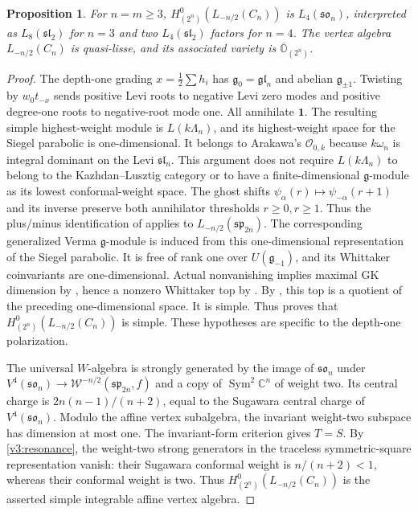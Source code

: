 \documentclass[11pt,a4paper]{amsart}
\numberwithin{equation}{section}
\newtheorem{proposition}[theorem]{Proposition}
\theoremstyle{definition}
\theoremstyle{remark}
\newcommand{\C}{\mathbb C}
\newcommand{\g}{\mathfrak g}
\newcommand{\clO}[1]{\overline{\mathbb O}_{(#1)}}
\newcommand{\spg}{\mathfrak{sp}}
\newcommand{\sog}{\mathfrak{so}}
\newcommand{\slg}{\mathfrak{sl}}
\newcommand{\glg}{\mathfrak{gl}}
\newcommand{\Sym}{\operatorname{Sym}}
\begin{document}
\begin{proposition}\label{seed:C-full}
For $n=m\ge3$, $H^0_{(2^n)}(L_{-n/2}(C_n))$ is
$L_4(\sog_n)$, interpreted as $L_8(\slg_2)$ for $n=3$ and two
$L_4(\slg_2)$ factors for $n=4$. The vertex algebra $L_{-n/2}(C_n)$ is quasi-lisse, and its associated
variety is $\clO{2^n}$.
\end{proposition}
\begin{proof}
The depth-one grading $x=\frac12\sum h_i$ has
$\g_0=\glg_n$ and abelian $\g_{\pm1}$. Twisting by $w_0t_{-x}$
sends positive Levi roots to negative Levi zero modes and positive
degree-one roots to negative-root mode one. All annihilate $\mathbf1$.
The resulting simple highest-weight module is $L(k\Lambda_n)$, and
its highest-weight space for the Siegel parabolic is one-dimensional. It belongs to Arakawa's $\mathcal O_{0,k}$ because
$k\omega_n$ is integral dominant on the Levi $\slg_n$.
This argument does not require $L(k\Lambda_n)$ to belong to
the Kazhdan--Lusztig category or to have a finite-dimensional
$\g$-module as its lowest conformal-weight space. 
The ghost shifts $\psi_\alpha(r)\mapsto\psi_{-\alpha}(r+1)$ and
its inverse preserve both annihilator thresholds $r\ge0,r\ge1$.
Thus the plus/minus identification of \cite[Section~4.3]{Arakawa2011}
applies to $L_{-n/2}(\spg_{2n})$.
The corresponding generalized Verma $\g$-module is induced from
this one-dimensional representation of the Siegel parabolic. It is
free of rank one over $U(\g_{-1})$, and its Whittaker coinvariants
are one-dimensional. Actual nonvanishing
implies maximal GK dimension by
\cite[Theorem~5.5.4(ii)]{Arakawa2011}, hence a nonzero
Whittaker top by \cite[Theorem~5.1.1]{Arakawa2011}.
By \cite[Proposition~5.4.2]{Arakawa2011}, this top is
a quotient of the preceding one-dimensional space. It is simple.
Thus \cite[Corollary~5.5.5]{Arakawa2011} proves that
$H^0_{(2^n)}(L_{-n/2}(C_n))$ is simple. These hypotheses
are specific to the depth-one polarization.

The universal $W$-algebra is strongly generated by the image of
$\sog_n$ under $V^4(\sog_n)\to\mathcal W^{-n/2}(\spg_{2n},f)$
and a copy of $\Sym^2\C^n$ of weight two. Its central charge is
$2n(n-1)/(n+2)$, equal to the Sugawara central charge of $V^4(\sog_n)$.
Modulo the affine vertex subalgebra, the invariant weight-two subspace
has dimension at most one.
The invariant-form criterion gives $T=S$. By \cref{v3:resonance},
the weight-two strong generators in the traceless symmetric-square
representation vanish: their Sugawara conformal weight is
$n/(n+2)<1$, whereas their conformal weight is two. Thus $H^0_{(2^n)}(L_{-n/2}(C_n))$ is the asserted simple
integrable affine vertex algebra.


\end{proof}
\end{document}
